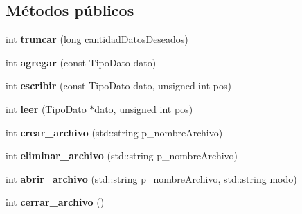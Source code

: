 \subsection*{\-Métodos públicos}
\begin{DoxyCompactItemize}
\item 
\hypertarget{class_manejador_archivo_datos_basicos_ac3c2e717414679126b15078c1aad6e71}{int {\bfseries truncar} (long cantidad\-Datos\-Deseados)}\label{class_manejador_archivo_datos_basicos_ac3c2e717414679126b15078c1aad6e71}

\item 
\hypertarget{class_manejador_archivo_datos_basicos_ac006d38b9359e51b5d21549ae115118d}{int {\bfseries agregar} (const \-Tipo\-Dato dato)}\label{class_manejador_archivo_datos_basicos_ac006d38b9359e51b5d21549ae115118d}

\item 
\hypertarget{class_manejador_archivo_datos_basicos_a436716ba5c65973b04482a4440a5aea6}{int {\bfseries escribir} (const \-Tipo\-Dato dato, unsigned int pos)}\label{class_manejador_archivo_datos_basicos_a436716ba5c65973b04482a4440a5aea6}

\item 
\hypertarget{class_manejador_archivo_datos_basicos_ad2d832ac0942849849bd30268cd0b6cb}{int {\bfseries leer} (\-Tipo\-Dato $\ast$dato, unsigned int pos)}\label{class_manejador_archivo_datos_basicos_ad2d832ac0942849849bd30268cd0b6cb}

\item 
\hypertarget{class_manejador_archivo_datos_basicos_a9d1f47ed4bca35735307c9efc40cf077}{int {\bfseries crear\-\_\-archivo} (std\-::string p\-\_\-nombre\-Archivo)}\label{class_manejador_archivo_datos_basicos_a9d1f47ed4bca35735307c9efc40cf077}

\item 
\hypertarget{class_manejador_archivo_datos_basicos_a35b470cff9e66edaaa35f01e31562d72}{int {\bfseries eliminar\-\_\-archivo} (std\-::string p\-\_\-nombre\-Archivo)}\label{class_manejador_archivo_datos_basicos_a35b470cff9e66edaaa35f01e31562d72}

\item 
\hypertarget{class_manejador_archivo_datos_basicos_a064c5363b09a9d35618e9e2e201d6d9a}{int {\bfseries abrir\-\_\-archivo} (std\-::string p\-\_\-nombre\-Archivo, std\-::string modo)}\label{class_manejador_archivo_datos_basicos_a064c5363b09a9d35618e9e2e201d6d9a}

\item 
\hypertarget{class_manejador_archivo_datos_basicos_aff4a1b613c74651f58d7ad74071c07fe}{int {\bfseries cerrar\-\_\-archivo} ()}\label{class_manejador_archivo_datos_basicos_aff4a1b613c74651f58d7ad74071c07fe}


\end{DoxyCompactItemize}

